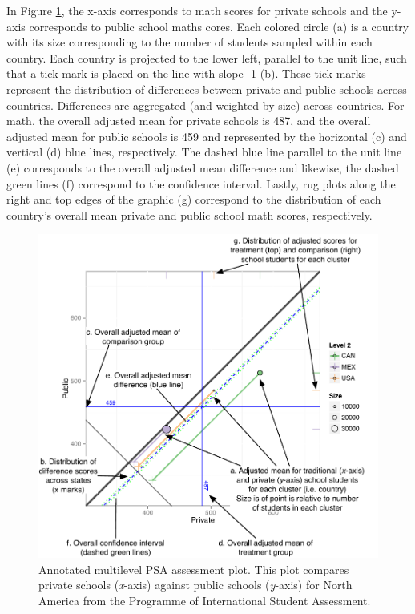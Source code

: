 \documentclass[letterpaper,12p,twoside]{article} %
\begin{document}
In Figure \ref{fig:g8math:circ}, the x-axis corresponds to math scores for private schools and the y-axis corresponds to public school maths cores. Each colored circle (a) is a country with its size corresponding to the number of students sampled within each country. Each country is projected to the lower left, parallel to the unit line, such that a tick mark is placed on the line with slope -1 (b). These tick marks represent the distribution of differences between private and public schools across countries. Differences are aggregated (and weighted by size) across countries. For math, the overall adjusted mean for private schools is 487, and the overall adjusted mean for public schools is 459 and represented by the horizontal (c) and vertical (d) blue lines, respectively. The dashed blue line parallel to the unit line (e) corresponds to the overall adjusted mean difference and likewise, the dashed green lines (f) correspond to the confidence interval. Lastly, rug plots along the right and top edges of the graphic (g) correspond to the distribution of each country's overall mean private and public school math scores, respectively.

\setlength{\belowcaptionskip}{-10pt}
\begin{figure}[t!]
\begin{center}
\includegraphics[width=.9\textwidth]{../Figures/AnnotatedCircPlot.pdf}
\caption[Annotated multilevel PSA assessment plot]{Annotated multilevel PSA assessment plot. This plot compares private schools (\textit{x}-axis) against public schools (\textit{y}-axis) for North America from the Programme of International Student Assessment.}
\label{fig:g8math:circ}
\end{center}
\end{figure}
\setlength{\belowcaptionskip}{0pt}
\end{document}
